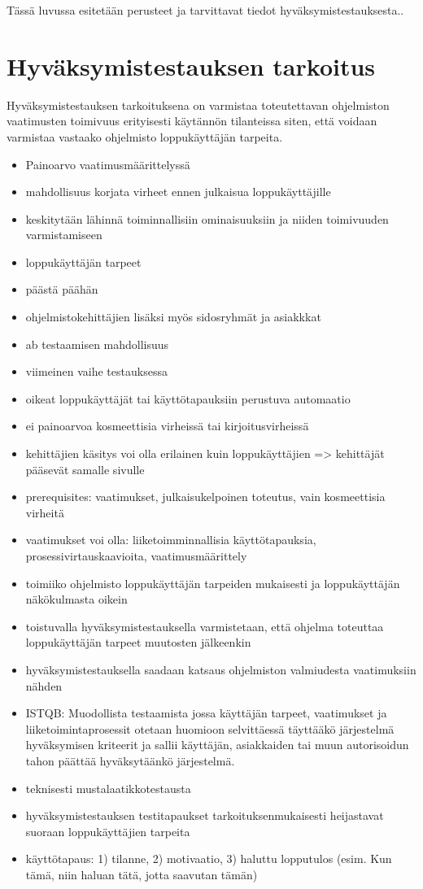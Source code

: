 Tässä luvussa esitetään perusteet ja tarvittavat tiedot hyväksymistestauksesta..

\section{Hyväksymistestauksen tarkoitus} \label{ch:08_hyvaksymistestauksen_tarkoitus}

  Hyväksymistestauksen tarkoituksena on varmistaa toteutettavan ohjelmiston vaatimusten toimivuus erityisesti käytännön tilanteissa siten, että voidaan varmistaa vastaako ohjelmisto loppukäyttäjän tarpeita.

  \begin{itemize}
    \item Painoarvo vaatimusmäärittelyssä
    \item mahdollisuus korjata virheet ennen julkaisua loppukäyttäjille
    \item keskitytään lähinnä toiminnallisiin ominaisuuksiin ja niiden toimivuuden varmistamiseen
    \item loppukäyttäjän tarpeet
    \item päästä päähän
    \item ohjelmistokehittäjien lisäksi myös sidosryhmät ja asiakkkat
    \item ab testaamisen mahdollisuus
    \item viimeinen vaihe testauksessa
    \item oikeat loppukäyttäjät tai käyttötapauksiin perustuva automaatio
    \item ei painoarvoa kosmeettisia virheissä tai kirjoitusvirheissä
    \item kehittäjien käsitys voi olla erilainen kuin loppukäyttäjien => kehittäjät pääsevät samalle sivulle
    \item prerequisites: vaatimukset, julkaisukelpoinen toteutus, vain kosmeettisia virheitä
    \item vaatimukset voi olla: liiketoimminnallisia käyttötapauksia, prosessivirtauskaavioita, vaatimusmäärittely
    \item toimiiko ohjelmisto loppukäyttäjän tarpeiden mukaisesti ja loppukäyttäjän näkökulmasta oikein
    \item toistuvalla hyväksymistestauksella varmistetaan, että ohjelma toteuttaa loppukäyttäjän tarpeet muutosten jälkeenkin
    \item hyväksymistestauksella saadaan katsaus ohjelmiston valmiudesta vaatimuksiin nähden
    \item ISTQB: Muodollista testaamista jossa käyttäjän tarpeet, vaatimukset ja liiketoimintaprosessit otetaan huomioon selvittäessä täyttääkö järjestelmä hyväksymisen kriteerit ja sallii käyttäjän, asiakkaiden tai muun autorisoidun tahon päättää hyväksytäänkö järjestelmä.
    \item teknisesti mustalaatikkotestausta
    \item hyväksymistestauksen testitapaukset tarkoituksenmukaisesti heijastavat suoraan loppukäyttäjien tarpeita
    \item käyttötapaus: 1) tilanne, 2) motivaatio, 3) haluttu lopputulos (esim. Kun tämä, niin haluan tätä, jotta saavutan tämän)
  \end{itemize}

